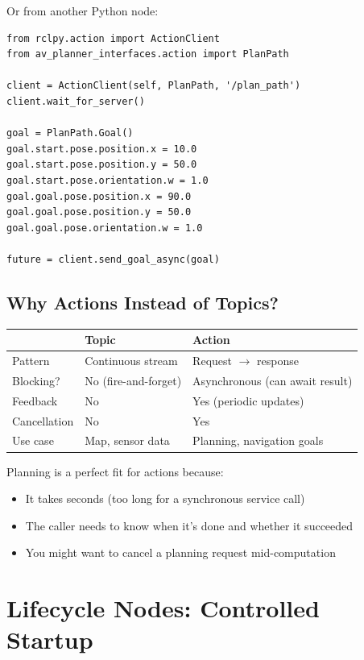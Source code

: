 \documentclass[12pt, a4paper]{article}
\begin{document}
Or from another Python node:

\begin{lstlisting}[style=python, caption={Sending a goal from Python (future mission planner)}]
from rclpy.action import ActionClient
from av_planner_interfaces.action import PlanPath

client = ActionClient(self, PlanPath, '/plan_path')
client.wait_for_server()

goal = PlanPath.Goal()
goal.start.pose.position.x = 10.0
goal.start.pose.position.y = 50.0
goal.start.pose.orientation.w = 1.0
goal.goal.pose.position.x = 90.0
goal.goal.pose.position.y = 50.0
goal.goal.pose.orientation.w = 1.0

future = client.send_goal_async(goal)
\end{lstlisting}

\subsection{Why Actions Instead of Topics?}

\begin{center}
\begin{tabular}{lll}
    \toprule
    & \textbf{Topic} & \textbf{Action} \\
    \midrule
    Pattern & Continuous stream & Request $\to$ response \\
    Blocking? & No (fire-and-forget) & Asynchronous (can await result) \\
    Feedback & No & Yes (periodic updates) \\
    Cancellation & No & Yes \\
    Use case & Map, sensor data & Planning, navigation goals \\
    \bottomrule
\end{tabular}
\end{center}

Planning is a perfect fit for actions because:
\begin{itemize}[nosep]
    \item It takes seconds (too long for a synchronous service call)
    \item The caller needs to know when it's done and whether it succeeded
    \item You might want to cancel a planning request mid-computation
\end{itemize}


\section{Lifecycle Nodes: Controlled Startup}
\label{sec:lifecycle}
\end{document}
